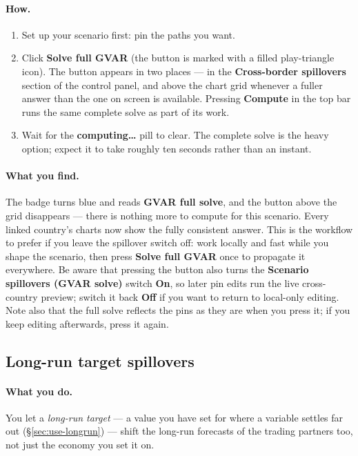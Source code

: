\documentclass[11pt]{article}
\theoremstyle{definition}
\theoremstyle{remark}
\begin{document}
\paragraph{How.}
\begin{enumerate}
  \item Set up your scenario first: pin the paths you want.
  \item Click \textbf{Solve full GVAR} (the button is marked with a filled
    play-triangle icon). The button appears in two places --- in the
    \textbf{Cross-border spillovers} section of the control panel, and above the
    chart grid whenever a fuller answer than the one on screen is available.
    Pressing \textbf{Compute} in the top bar runs the same complete solve as
    part of its work.
  \item Wait for the \textbf{computing\ldots} pill to clear. The complete solve
    is the heavy option; expect it to take roughly ten seconds rather than an
    instant.
\end{enumerate}

\paragraph{What you find.} The badge turns blue and reads
\textbf{GVAR full solve}, and the button above the grid disappears --- there is
nothing more to compute for this scenario. Every linked country's charts now
show the fully consistent answer. This is the workflow to prefer if you leave
the spillover switch off: work locally and fast while you shape the scenario,
then press \textbf{Solve full GVAR} once to propagate it everywhere. Be aware
that pressing the button also turns the \textbf{Scenario spillovers (GVAR
solve)} switch \textbf{On}, so later pin edits run the live cross-country
preview; switch it back \textbf{Off} if you want to return to local-only
editing. Note also that the full solve reflects the pins as they are when you
press it; if you keep editing afterwards, press it again.

\subsection{Long-run target spillovers}

\paragraph{What you do.} You let a \emph{long-run target} --- a value you have
set for where a variable settles far out (\S\ref{sec:use-longrun}) --- shift the
long-run forecasts of the trading partners too, not just the economy you set it
on.
\end{document}
